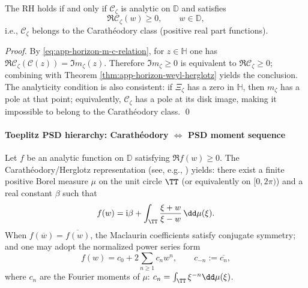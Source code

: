 \begin{corollary}\label{cor:app-horizon-carath-rh}
The RH holds if and only if \(\mathscr{C}_{\zeta}\) is analytic on \(\mathbb{D}\) and satisfies
\[
\Re \mathscr{C}_{\zeta}(w)\ge 0,\qquad w\in\mathbb{D},
\]
i.e., \(\mathscr{C}_{\zeta}\) belongs to the Carath\'eodory class (positive real part functions).
\end{corollary}

\begin{proof}
By \eqref{eq:app-horizon-m-c-relation}, for \(z\in\mathbb{H}\) one has
\(\Re \mathscr{C}_{\zeta}(\mathcal{C}(z))=\Im m_{\zeta}(z)\).
Therefore \(\Im m_{\zeta}\ge 0\) is equivalent to \(\Re\mathscr{C}_{\zeta}\ge 0\);
combining with Theorem \ref{thm:app-horizon-weyl-herglotz} yields the conclusion.
The analyticity condition is also consistent: if \(\Xi_{\zeta}\) has a zero in \(\mathbb{H}\), then \(m_{\zeta}\) has a pole at that point; equivalently, \(\mathscr{C}_{\zeta}\) has a pole at its disk image, making it impossible to belong to the Carath\'eodory class. \qed
\end{proof}

\paragraph{Toeplitz PSD hierarchy: Carath\'eodory \texorpdfstring{$\Leftrightarrow$}{<->} PSD moment sequence}
Let \(f\) be an analytic function on \(\mathbb{D}\) satisfying \(\Re f(w)\ge 0\).
The Carath\'eodory/Herglotz representation (see, e.g., \cite{Duren1970TheoryHp,Garnett2007BoundedAnalyticFunctions,Simon2005OPUC1}) yields: there exist a finite positive Borel measure \(\mu\) on the unit circle \(\TT\) (or equivalently on \([0,2\pi)\)) and a real constant \(\beta\) such that
\begin{equation}\label{eq:app-horizon-herglotz-disk}
f(w)=\mathrm{i}\beta+\int_{\TT}\frac{\xi+w}{\xi-w}\,\dd\mu(\xi).
\end{equation}
When \(f(\overline w)=\overline{f(w)}\), the Maclaurin coefficients satisfy conjugate symmetry; and one may adopt the normalized power series form
\begin{equation}\label{eq:app-horizon-carath-series}
f(w)=c_0+2\sum_{n\ge 1}c_n w^n,\qquad c_{-n}:=\overline{c_n},
\end{equation}
where \(c_n\) are the Fourier moments of \(\mu\): \(c_n=\int_{\TT}\xi^{-n}\dd\mu(\xi)\).

